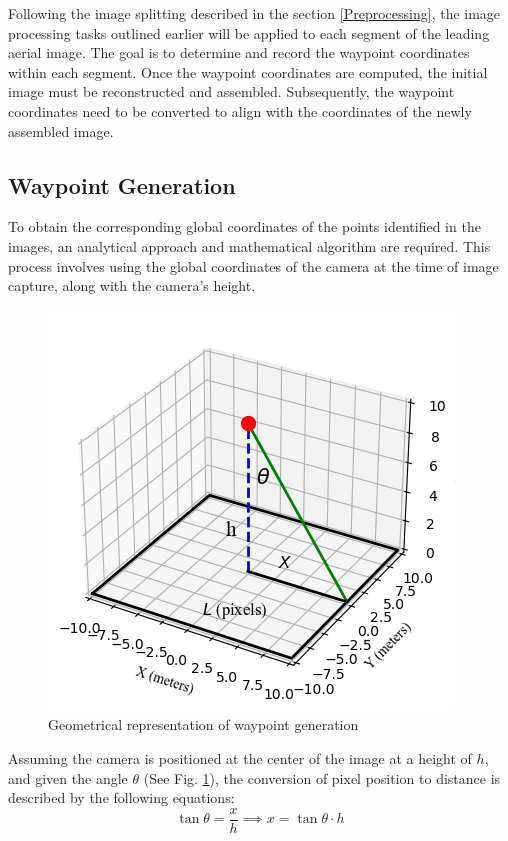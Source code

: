 \documentclass[conference]{IEEEtran}
\begin{document}
	Following the image splitting described in the section
	\ref{Preprocessing}, the image processing tasks outlined earlier will be applied to each segment of the leading aerial image. The goal is to determine and record the waypoint coordinates within each segment. Once the waypoint coordinates are computed, the initial image must be reconstructed and assembled. Subsequently, the waypoint coordinates need to be converted to align with the coordinates of the newly assembled image.
	
	\subsection{Waypoint Generation}\label{Waypoint Generation}
	To obtain the corresponding global coordinates of the points identified in the images, an analytical approach and mathematical algorithm are required. This process involves using the global coordinates of the camera at the time of image capture, along with the camera's height.
	
	\begin{figure}[t]
		\centering
		\includegraphics[width=0.7\linewidth]{waypoint_geometry}
		\caption{Geometrical representation of waypoint generation}
		\label{fig:waypointgeometry}
	\end{figure}
	
	Assuming the camera is positioned at the center of the image at a height of \( h \), and given the angle \( \theta \) (See Fig. \ref{fig:waypointgeometry}), the conversion of pixel position to distance is described by the following equations:
	\begin{equation}
		\tan \theta = \frac{x}{h} \implies x = \tan \theta  \cdot h
		\label{eq:1}
	\end{equation}
	
\end{document}
